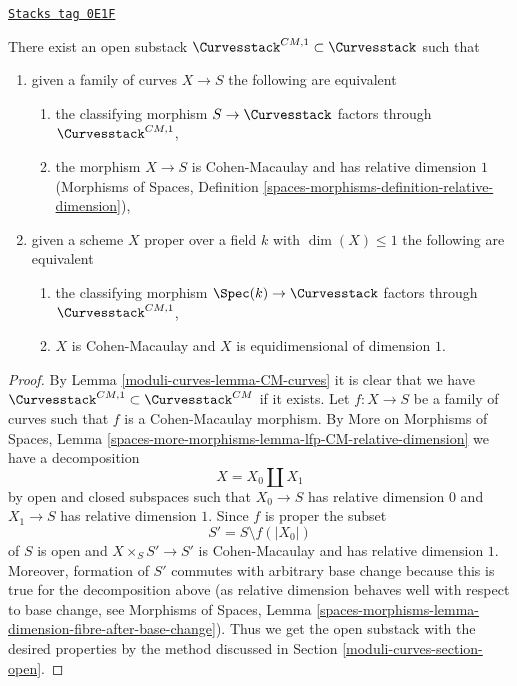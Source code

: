 \begin{lemma}[CM 1 curves]
\label{moduli-curves-lemma-CM-1-curves}
\href{https://stacks.math.columbia.edu/tag/0E1F}{\texttt{Stacks tag 0E1F}}

There exist an open substack $\Curvesstack^{CM, 1} \subset \Curvesstack$
such that
\begin{enumerate}
\item given a family of curves $X \to S$ the following are equivalent
\begin{enumerate}
\item the classifying morphism $S \to \Curvesstack$ factors
through $\Curvesstack^{CM, 1}$,
\item the morphism $X \to S$ is Cohen-Macaulay and has
relative dimension $1$ (Morphisms of Spaces, Definition
\ref{spaces-morphisms-definition-relative-dimension}),
\end{enumerate}
\item given a scheme $X$ proper over a field $k$ with $\dim(X) \leq 1$
the following are equivalent
\begin{enumerate}
\item the classifying morphism $\Spec(k) \to \Curvesstack$ factors
through $\Curvesstack^{CM, 1}$,
\item $X$ is Cohen-Macaulay and $X$ is equidimensional of
dimension $1$.
\end{enumerate}
\end{enumerate}
\end{lemma}

\begin{proof}
By Lemma \ref{moduli-curves-lemma-CM-curves} it is clear that we have
$\Curvesstack^{CM, 1} \subset \Curvesstack^{CM}$
if it exists. Let $f : X \to S$ be a family of curves
such that $f$ is a Cohen-Macaulay morphism. By
More on Morphisms of Spaces, Lemma
\ref{spaces-more-morphisms-lemma-lfp-CM-relative-dimension}
we have a decomposition
$$
X = X_0 \amalg X_1
$$
by open and closed subspaces such that $X_0 \to S$ has relative
dimension $0$ and $X_1 \to S$ has relative dimension $1$.
Since $f$ is proper the subset
$$
S' = S \setminus f(|X_0|)
$$
of $S$ is open and $X \times_S S' \to S'$ is Cohen-Macaulay
and has relative dimension $1$.
Moreover, formation of $S'$ commutes with arbitrary base
change because this is true for the decomposition above
(as relative dimension behaves well with respect to base
change, see Morphisms of Spaces, Lemma
\ref{spaces-morphisms-lemma-dimension-fibre-after-base-change}).
Thus we get the open substack with the desired properties
by the method discussed in Section \ref{moduli-curves-section-open}.
\end{proof}

